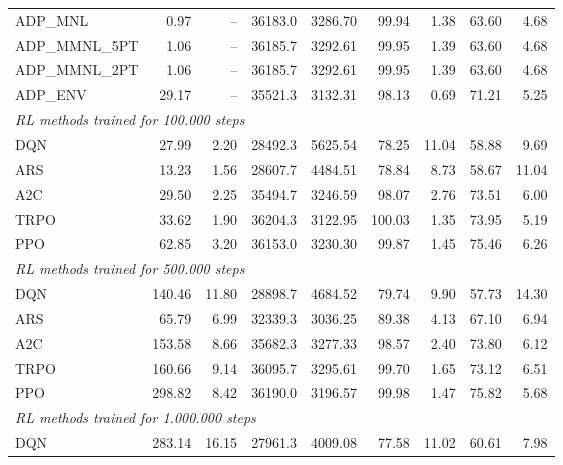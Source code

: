 \begin{samepage}
\begin{center}
\begin{tabular}{l|rr|rr|rr|rr}
    \midrule
    ADP\_MNL     &     0.97 &    -- &    36183.0 &    3286.70 &   99.94 &    1.38 &   63.60 &    4.68 \\
    ADP\_MMNL\_5PT &     1.06 &    -- &    36185.7 &    3292.61 &   99.95 &    1.39 &   63.60 &    4.68 \\
    ADP\_MMNL\_2PT &     1.06 &    -- &    36185.7 &    3292.61 &   99.95 &    1.39 &   63.60 &    4.68 \\
    ADP\_ENV     &    29.17 &    -- &    35521.3 &    3132.31 &   98.13 &    0.69 &   71.21 &    5.25 \\
    \midrule
    \multicolumn{9}{l}{\textit{RL methods trained for 100.000 steps}} \\
    \midrule
    DQN          &    27.99 &     2.20 &    28492.3 &    5625.54 &   78.25 &   11.04 &   58.88 &    9.69 \\
    ARS          &    13.23 &     1.56 &    28607.7 &    4484.51 &   78.84 &    8.73 &   58.67 &   11.04 \\
    A2C          &    29.50 &     2.25 &    35494.7 &    3246.59 &   98.07 &    2.76 &   73.51 &    6.00 \\
    TRPO         &    33.62 &     1.90 &    36204.3 &    3122.95 &  100.03 &    1.35 &   73.95 &    5.19 \\
    PPO          &    62.85 &     3.20 &    36153.0 &    3230.30 &   99.87 &    1.45 &   75.46 &    6.26 \\
    \midrule
    \multicolumn{9}{l}{\textit{RL methods trained for 500.000 steps}} \\
    \midrule
    DQN          &   140.46 &    11.80 &    28898.7 &    4684.52 &   79.74 &    9.90 &   57.73 &   14.30 \\
    ARS          &    65.79 &     6.99 &    32339.3 &    3036.25 &   89.38 &    4.13 &   67.10 &    6.94 \\
    A2C          &   153.58 &     8.66 &    35682.3 &    3277.33 &   98.57 &    2.40 &   73.80 &    6.12 \\
    TRPO         &   160.66 &     9.14 &    36095.7 &    3295.61 &   99.70 &    1.65 &   73.12 &    6.51 \\
    PPO          &   298.82 &     8.42 &    36190.0 &    3196.57 &   99.98 &    1.47 &   75.82 &    5.68 \\
    \midrule
    \multicolumn{9}{l}{\textit{RL methods trained for 1.000.000 steps}} \\
    \midrule
    DQN          &   283.14 &    16.15 &    27961.3 &    4009.08 &   77.58 &   11.02 &   60.61 &    7.98 \\

\end{tabular}
\end{center}
\end{samepage}

